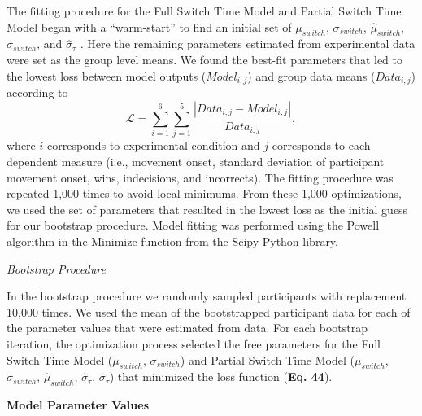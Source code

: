 \documentclass[12pt]{article}
\newcommand\boldblue[1]{\textcolor{mydarkblue}{\textbf{#1}}}
\begin{document}
\noindent The fitting procedure for the Full Switch Time Model and Partial Switch Time Model began with a “warm-start” to find an initial set of $\mu_{switch}$, $\sigma_{switch}$, $\hat{\mu}_{switch}$, $\hat{\sigma}_{switch}$, and $\hat{\sigma}_{\tau}$ \autocite*{rothReinforcementbasedProcessesActively2023,rothPunishmentLeadsGreater2024}.  Here the remaining parameters estimated from experimental data were set as the group level means. We found the best-fit parameters that led to the lowest loss between model outputs ($Model_{i,j}$) and group data means ($Data_{i,j}$) according to
\begin{equation}
    \mathcal{L} = \sum_{i = 1}^{6} \sum_{j = 1}^{5} \frac{|Data_{i,j} - Model_{i,j}|}{Data_{i,j}},
\end{equation}
where $i$ corresponds to experimental condition and $j$ corresponds to each dependent measure (i.e., movement onset, standard deviation of participant movement onset, wins, indecisions, and incorrects). The fitting procedure was repeated 1,000 times to avoid local minimums. From these 1,000 optimizations, we used the set of parameters that resulted in the lowest loss as the initial guess for our bootstrap procedure. Model fitting was performed using the Powell algorithm in the Minimize function from the Scipy Python library.

\vspace{2mm}
\noindent\emph{Bootstrap Procedure}

\noindent In the bootstrap procedure we randomly sampled participants with replacement 10,000 times\autocite*{cashabackGradientReinforcementLandscape2019a, cashabackDissociatingErrorbasedReinforcementbased2017,rothReinforcementbasedProcessesActively2023,rothPunishmentLeadsGreater2024}. We used the mean of the bootstrapped participant data for each of the parameter values that were estimated from data. For each bootstrap iteration, the optimization process selected the free parameters for the Full Switch Time Model ($\mu_{switch}$, $\sigma_{switch}$) and Partial Switch Time Model ($\mu_{switch}$, $\sigma_{switch}$, $\hat{\mu}_{switch}$, $\hat{\sigma}_{\tau}$, $\hat{\sigma}_{\tau}$) that minimized the loss function (\boldblue{Eq. 44}).

\vspace{2mm}
\noindent \boldblue{Model Parameter Values}
\end{document}
